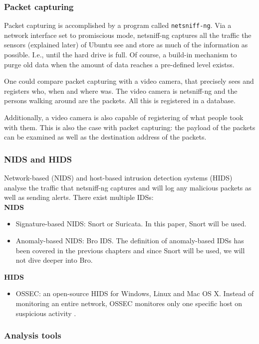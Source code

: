 \subsubsection{Packet capturing}

Packet capturing is accomplished by a program called \texttt{netsniff-ng}. Via a network interface set to promiscious mode, netsniff-ng captures all the traffic the sensors (explained later) of Ubuntu see and store as much of the information as possible. I.e., until the hard drive is full. Of course, a build-in mechanism to purge old data when the amount of data reaches a pre-defined level existss.

One could compare packet capturing with a video camera, that precisely sees and registers who, when and where was. The video camera is netsniff-ng and the persons walking around are the packets. All this is registered in a database.

Additionally, a video camera is also capable of registering of what people took with them. This is also the case with packet capturing: the payload of the packets can be examined as well as the destination address of the packets.

\subsubsection{NIDS and HIDS}

Network-based (NIDS) and host-based intrusion detection systems (HIDS) analyse the traffic that netsniff-ng captures and will log any malicious packets as well as sending alerts. There exist multiple IDSs:\\
\textbf{NIDS}
\begin{itemize}
\item Signature-based NIDS: Snort or Suricata. In this paper, Snort will be used.
\item Anomaly-based NIDS: Bro IDS. The definition of anomaly-based IDSs has been covered in the previous chapters and since Snort will be used, we will not dive deeper into Bro.
\end{itemize}
\textbf{HIDS}
\begin{itemize}
\item OSSEC: an open-source HIDS for Windows, Linux and Mac OS X. Instead of monitoring an entire network, OSSEC monitores only one specific host on suspicious activity \citep{OSSEC}.
\end{itemize}

\subsubsection{Analysis tools}

